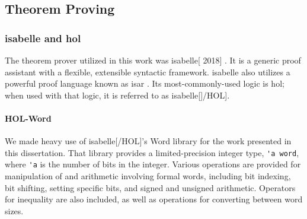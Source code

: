 %
%
%

\subsection{Theorem Proving}


\subsubsection{\Gls{isabelle} and \acs*{hol}}
The theorem prover utilized in this work
was \gls{isabelle}[ 2018] \autocite{nipkow2002isabelle}.
It is a generic proof assistant with a flexible, extensible syntactic framework.
\Gls{isabelle} also utilizes a powerful proof language
known as \ac{isar} \autocite{wenzel2007isabelle}.
Its most-commonly-used logic is \ac{hol}; when used with that logic,
it is referred to as \gls{isabelle}[]/HOL].

\paragraph{HOL-Word}
We made heavy use of \gls{isabelle}[/HOL]'s Word library \autocite{isabelle-word-session}
for the work presented in this dissertation.
That library provides a limited-precision integer type, \lstinline|'a word|,
where \lstinline|'a| is the number of bits in the integer.
Various operations are provided for manipulation of and arithmetic
involving formal words, including bit indexing, bit shifting, setting specific bits,
and signed and unsigned arithmetic.
Operators for inequality are also included,
as well as operations for converting between word sizes.

